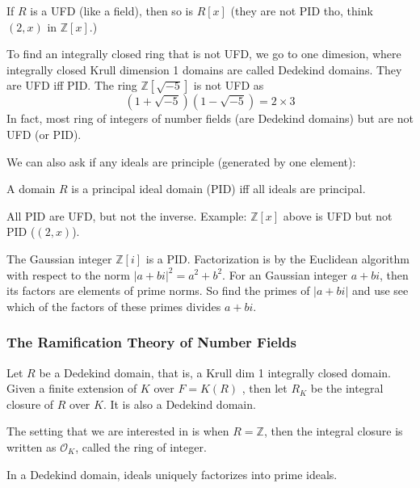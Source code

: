 \documentclass[main.tex]{subfiles}
\begin{document}
\begin{example}
If $R$ is a UFD (like a field), then so is $R[x]$ (they are not PID tho, think $(2, x)$ in $\mathbb{Z}[x]$.)

To find an integrally closed ring that is not UFD, we go to one dimesion, where integrally closed Krull dimension 1 domains are called Dedekind domains. They are UFD iff PID. The ring $\mathbb{Z}[\sqrt{-5}]$ is not UFD as 
$$
(1 + \sqrt{-5}) (1 - \sqrt{-5}) = 2 \times 3
$$
In fact, most ring of integers of number fields (are Dedekind domains) but are not UFD (or PID).
\end{example}

We can also ask if any ideals are principle (generated by one element):

\begin{definition}
A domain $R$ is a principal ideal domain (PID) iff all ideals are principal.
\end{definition}

\begin{remark}
All PID are UFD, but not the inverse. Example: $\mathbb{Z}[x]$ above is UFD but not PID ($(2, x)$).
\end{remark}

\begin{example}
The Gaussian integer $\mathbb{Z}[i]$ is a PID. Factorization is by the Euclidean algorithm with respect to the norm $|a + bi|^2 = a^2 + b^2$. For an Gaussian integer $a + bi$, then its factors are elements of prime norms. So find the primes of $|a + bi|$ and use see which of the factors of these primes divides $a + bi$.
\end{example}


\subsubsection{The Ramification Theory of Number Fields}

Let $R$ be a Dedekind domain, that is, a Krull dim 1 integrally closed domain. Given a finite extension of $K$ over $F = K(R)$ , then let $R_K$ be the integral closure of $R$ over $K$. It is also a Dedekind domain.

\begin{remark}
The setting that we are interested in is when $R = \mathbb{Z}$, then the integral closure is written as $\mathcal{O}_K$, called the ring of integer.
\end{remark}

\begin{lemma}
In a Dedekind domain, ideals uniquely factorizes into prime ideals.
\end{lemma}
\end{document}
